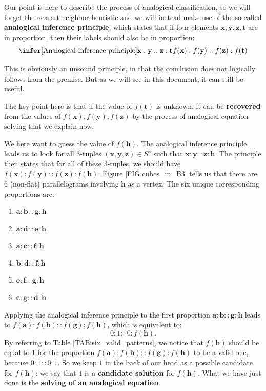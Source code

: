 Our point is here to describe the process of analogical classification, so we
will forget the nearest neighbor heuristic and we will instead make use of the
so-called \textbf{analogical inference principle}, which states that if four
elements $\mathbf{x}, \mathbf{y}, \mathbf{z}, \mathbf{t}$ are in proportion,
then their labels should also be in proportion:
$$
\infer[\text{Analogical inference principle}]{\mathbf{x} : \mathbf{y} ::
\mathbf{z} : \mathbf{t}}{f(\mathbf{x}) : f(\mathbf{y}) :: f(\mathbf{z}) :
f(\mathbf{t})}
$$

This is obviously an unsound principle, in that the conclusion does not
logically follows from the premise. But as we will see in this document, it can
still be useful.

The key point here is that if the value of $f(\mathbf{t})$ is unknown, it can
be \textbf{recovered} from the values of $f(\mathbf{x}), f(\mathbf{y}),
f(\mathbf{z})$ by the process of analogical equation solving that we explain
now.

We here want to guess the
value of $f(\mathbf{h})$. The analogical inference principle leads us to look
for all 3-tuples $(\mathbf{x}, \mathbf{y}, \mathbf{z}) \in S^3$ such that
$\mathbf{x}:\mathbf{y}::\mathbf{z}:\mathbf{h}$.  The principle then states that
for all of these $3$-tuples, we should have
$f(\mathbf{x}):f(\mathbf{y})::f(\mathbf{z}):f(\mathbf{h})$.
Figure \ref{FIG:cubes_in_B3} tells us that there are 6 (non-flat)
parallelograms involving $\mathbf{h}$ as a vertex. The six unique corresponding
proportions are:

\begin{enumerate}
  \item $\mathbf{a} : \mathbf{b} :: \mathbf{g} : \mathbf{h}$
  \item $\mathbf{a} : \mathbf{d} :: \mathbf{e} : \mathbf{h}$
  \item $\mathbf{a} : \mathbf{c} :: \mathbf{f} : \mathbf{h}$
  \item $\mathbf{b} : \mathbf{d} :: \mathbf{f} : \mathbf{h}$
  \item $\mathbf{e} : \mathbf{f} :: \mathbf{g} : \mathbf{h}$
  \item $\mathbf{c} : \mathbf{g} :: \mathbf{d} : \mathbf{h}$
\end{enumerate}

Applying the analogical inference principle to the first proportion $\mathbf{a}
: \mathbf{b} :: \mathbf{g} : \mathbf{h}$ leads to $f(\mathbf{a}) :
f(\mathbf{b}) :: f(\mathbf{g}) : f(\mathbf{h})$, which is equivalent to:
$$0:1::0:f(\mathbf{h}).$$ By referring to Table \ref{TAB:six_valid_patterns}, we
notice that $f(\mathbf{h})$ should be equal to $1$ for the proportion
$f(\mathbf{a}) : f(\mathbf{b}) :: f(\mathbf{g}) : f(\mathbf{h})$ to be a valid
one, because $0:1::0:1$. So we keep $1$ in the back of our head as a possible
candidate for $f(\mathbf{h})$: we say that $1$ is a \textbf{candidate
solution} for $f(\mathbf{h})$.  What we have just done is the \textbf{solving
of an analogical equation}.

